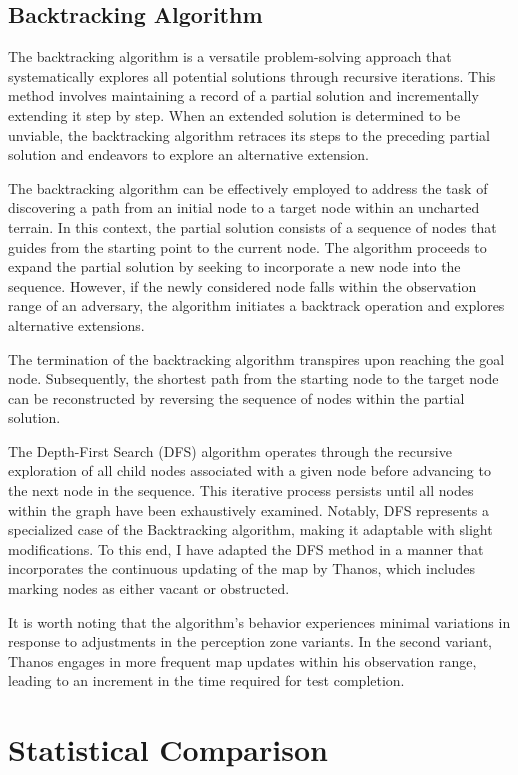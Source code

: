 \documentclass{article}
\begin{document}
\subsection*{Backtracking Algorithm}

The backtracking algorithm is a versatile problem-solving approach that systematically explores all potential solutions through recursive iterations. This method involves maintaining a record of a partial solution and incrementally extending it step by step. When an extended solution is determined to be unviable, the backtracking algorithm retraces its steps to the preceding partial solution and endeavors to explore an alternative extension.

The backtracking algorithm can be effectively employed to address the task of discovering a path from an initial node to a target node within an uncharted terrain. In this context, the partial solution consists of a sequence of nodes that guides from the starting point to the current node. The algorithm proceeds to expand the partial solution by seeking to incorporate a new node into the sequence. However, if the newly considered node falls within the observation range of an adversary, the algorithm initiates a backtrack operation and explores alternative extensions.

The termination of the backtracking algorithm transpires upon reaching the goal node. Subsequently, the shortest path from the starting node to the target node can be reconstructed by reversing the sequence of nodes within the partial solution.

The Depth-First Search (DFS) algorithm operates through the recursive exploration of all child nodes associated with a given node before advancing to the next node in the sequence. This iterative process persists until all nodes within the graph have been exhaustively examined. Notably, DFS represents a specialized case of the Backtracking algorithm, making it adaptable with slight modifications. To this end, I have adapted the DFS method in a manner that incorporates the continuous updating of the map by Thanos, which includes marking nodes as either vacant or obstructed.

It is worth noting that the algorithm's behavior experiences minimal variations in response to adjustments in the perception zone variants. In the second variant, Thanos engages in more frequent map updates within his observation range, leading to an increment in the time required for test completion.

\section*{Statistical Comparison}
\end{document}
